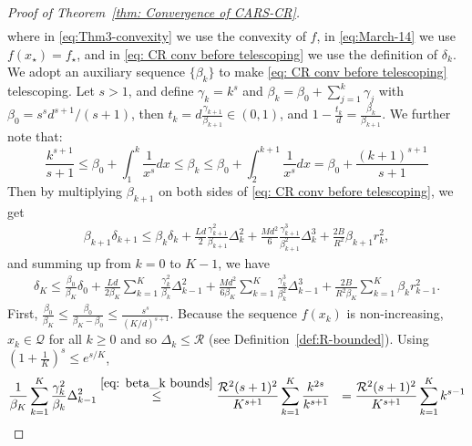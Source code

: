 \begin{proof}[Proof of Theorem~\ref{thm: Convergence of CARS-CR}]
\begin{align}
    \end{align}
    where in \eqref{eq:Thm3-convexity} we use the convexity of $f$, in \eqref{eq:March-14} we use $f(x_{\star}) = f_{\star}$,  and in \eqref{eq: CR conv before telescoping} we use the definition of $\delta_k$. We adopt an auxiliary sequence $\{\beta_k\}$ to make \eqref{eq: CR conv before telescoping} telescoping.
    Let $s>1$, and define $\gamma_k = k^s$ and $\beta_k = \beta_0 + \sum_{j=1}^{k}\gamma_j$ with $\beta_0 = s^s d^{s+1}/(s+1)$, then $t_k = d\frac{\gamma_{k+1}}{\beta_{k+1}} \in (0, 1)$, and $1 - \frac{t_k}{d} = \frac{\beta_k}{\beta_{k+1}}$. We further note that:
    \begin{equation}\label{eq: beta_k bounds}
        \frac{k^{s+1}}{s+1} \leq \beta_0 + \int_{1}^{k}\frac{1}{x^s} dx \leq \beta_k \leq \beta_0 + \int_{2}^{k+1}\frac{1}{x^s}dx = \beta_0 + \frac{(k+1)^{s+1}}{s+1}
    \end{equation}
    Then by multiplying $\beta_{k+1}$ on both sides of \eqref{eq: CR conv before telescoping}, we get
    \begin{align*}
        \beta_{k+1}\delta_{k+1} \leq \beta_k \delta_k + \frac{Ld}{2}\frac{ \gamma_{k+1}^2}{\beta_{k+1}}\Delta_k^2
        + \frac{Md^2}{6} \frac{ \gamma_{k+1}^3}{\beta_{k+1}^2}\Delta_k^3
        + \frac{2B}{R^2} \beta_{k+1} r_k^2,
    \end{align*}
    and summing up from $k=0$ to $K-1$, we have
    \begin{align}\label{eq: CR conv delta K bound as Sum}
        \delta_K \leq \frac{\beta_0}{\beta_K}\delta_0 + \frac{Ld}{2\beta_K} \sum_{k=1}^{K} \frac{\gamma_k^2}{\beta_k}\Delta_{k-1}^2
        + \frac{M d^2}{6\beta_K} \sum_{k=1}^{K} \frac{\gamma_k^3}{\beta_k^2}\Delta_{k-1}^3
        + \frac{2B}{R^2 \beta_K} \sum_{k=1}^{K} \beta_{k}r_{k-1}^2.
    \end{align}
    First,
    $  \frac{\beta_0}{\beta_K} \leq \frac{\beta_0}{\beta_K-\beta_0} \leq \frac{s^s}{(K/d)^{s+1}} $. Because the sequence $f(x_k)$ is non-increasing, $x_k \in \mathcal{Q}$ for all $k\geq 0$ and so $\Delta_k \leq \mathcal{R}$ (see Definition~\ref{def:R-bounded}).
    Using $(1+\frac{1}{K})^s \leq e^{s/K}$,
    \begin{align*}
        \frac{1}{\beta_K}\sum_{k=1}^{K}\frac{\gamma_k^2}{\beta_k}\Delta_{k-1}^2
         & \stackrel{\eqref{eq: beta_k bounds}}{\leq} \frac{\mathcal{R}^2(s+1)^2}{K^{s+1}} \sum_{k=1}^{K}\frac{k^{2s}}{k^{s+1}}
        ~~= \frac{\mathcal{R}^2(s+1)^2}{K^{s+1}} \sum_{k=1}^{K} k^{s-1}                                                         \\

\end{align*}
\end{proof}

